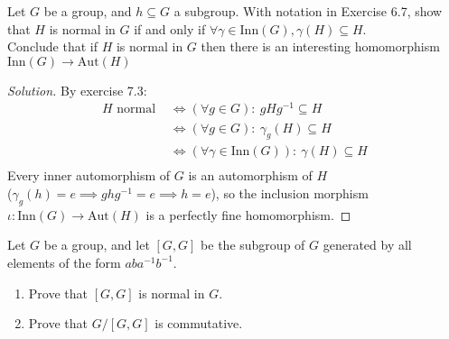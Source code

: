 \documentclass[12pt]{article}
\newenvironment{problem}[2][Problem]{\begin{trivlist}
\item[\hskip \labelsep {\bfseries #1}\hskip \labelsep {\bfseries #2.}]}{\end{trivlist}}
\newcommand{\Aut}{\text{Aut}}
\newenvironment{solution}
  {\renewcommand\qedsymbol{$\blacksquare$}\begin{proof}[Solution]}
{\end{proof}}
\theoremstyle{remark}
\begin{document}
\begin{problem}{7.10}
  Let $G$ be a group, and $h\subseteq G$ a subgroup.
  With notation in Exercise 6.7, show that $H$ is normal in $G$ if and only if
  $\forall\gamma\in \text{Inn}(G), \gamma(H)\subseteq H$.  \\
  Conclude that if $H$ is normal in $G$ then there is an interesting homomorphism \\
  $\text{Inn}(G)\to \text{Aut}(H)$
\end{problem}
\begin{solution}
  By exercise 7.3:
  \begin{align*}
    H\text{ normal } &\Leftrightarrow (\forall g\in G){:}~gHg^{-1}\subseteq H \\
    &\Leftrightarrow (\forall g\in G){:}~ \gamma_g(H)\subseteq H \\
    &\Leftrightarrow (\forall \gamma\in\text{Inn}(G)){:}~ \gamma(H)\subseteq H \\
  \end{align*}
  Every inner automorphism of $G$ is an automorphism of $H$ \\ 
  ($\gamma_g(h)=e\implies ghg^{-1}=e\implies h=e$), so the inclusion morphism 
  $\iota:\text{Inn}(G)\to \Aut(H)$ is a perfectly fine homomorphism.
\end{solution}
\begin{problem}{7.11}
  Let $G$ be a group, and let $[G,G]$ be the subgroup of $G$ generated by all elements of the form
  $aba^{-1}b^{-1}$.
  \begin{enumerate}
    \item Prove that $[G,G]$ is normal in $G$.
    \item Prove that $G/[G,G]$ is commutative.
  \end{enumerate}
\end{problem}
\end{document}

